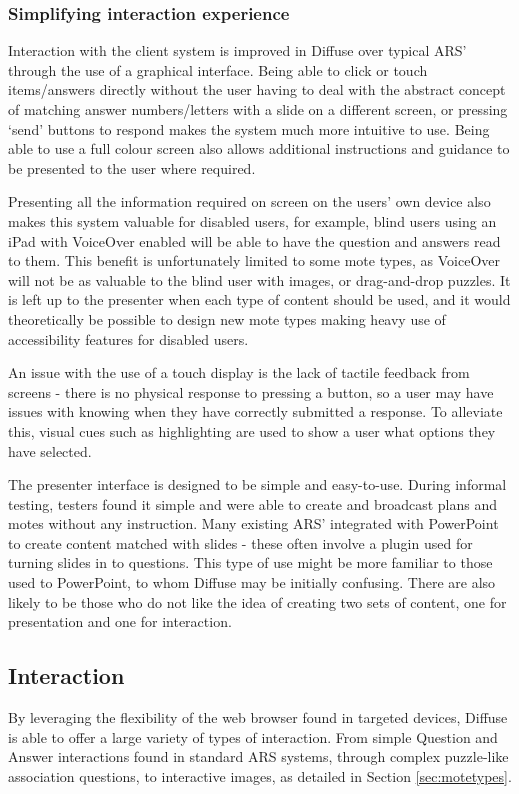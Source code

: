 \documentclass[a4papert,11pt,notitlepage]{article}
\begin{document}
\subsubsection{Simplifying interaction experience}
Interaction with the client system is improved in Diffuse over typical ARS' through the use of a graphical interface. Being able to click or touch items/answers directly without the user having to deal with the abstract concept of matching answer numbers/letters with a slide on a different screen, or pressing `send' buttons to respond makes the system much more intuitive to use. Being able to use a full colour screen also allows additional instructions and guidance to be presented to the user where required.

Presenting all the information required on screen on the users' own device also makes this system valuable for disabled users, for example, blind users using an iPad with VoiceOver enabled will be able to have the question and answers read to them. This benefit is unfortunately limited to some mote types, as VoiceOver will not be as valuable to the blind user with images, or drag-and-drop puzzles. It is left up to the presenter when each type of content should be used, and it would theoretically be possible to design new mote types making heavy use of accessibility features for disabled users.

An issue with the use of a touch display is the lack of tactile feedback from screens - there is no physical response to pressing a button, so a user may have issues with knowing when they have correctly submitted a response. To alleviate this, visual cues such as highlighting are used to show a user what options they have selected.

The presenter interface is designed to be simple and easy-to-use. During informal testing, testers found it simple and were able to create and broadcast plans and motes without any instruction. Many existing ARS' integrated with PowerPoint to create content matched with slides - these often involve a plugin used for turning slides in to questions. This type of use might be more familiar to those used to PowerPoint, to whom Diffuse may be initially confusing. There are also likely to be those who do not like the idea of creating two sets of content, one for presentation and one for interaction.

\subsection{Interaction}
\label{sec:evalinteraction}
By leveraging the flexibility of the web browser found in targeted devices, Diffuse is able to offer a large variety of types of interaction. From simple Question and Answer interactions found in standard ARS systems, through complex puzzle-like association questions, to interactive images, as detailed in Section \ref{sec:motetypes}. 
\end{document}
